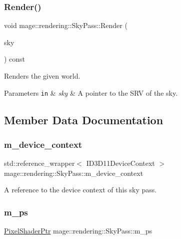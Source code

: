 \subsubsection{\texorpdfstring{Render()}{Render()}}
{\footnotesize\ttfamily void mage\+::rendering\+::\+Sky\+Pass\+::\+Render (\begin{DoxyParamCaption}\item[{I\+D3\+D11\+Shader\+Resource\+View $\ast$}]{sky }\end{DoxyParamCaption}) const\hspace{0.3cm}{\ttfamily [noexcept]}}

Renders the given world.


\begin{DoxyParams}[1]{Parameters}
\mbox{\tt in}  & {\em sky} & A pointer to the S\+RV of the sky. \\
\hline
\end{DoxyParams}


\subsection{Member Data Documentation}
\hypertarget{classmage_1_1rendering_1_1_sky_pass_a5639f9eb6bf863074c5e5afba2f0e2f5}{}\label{classmage_1_1rendering_1_1_sky_pass_a5639f9eb6bf863074c5e5afba2f0e2f5} 
\subsubsection{\texorpdfstring{m\+\_\+device\+\_\+context}{m\_device\_context}}
{\footnotesize\ttfamily std\+::reference\+\_\+wrapper$<$ I\+D3\+D11\+Device\+Context $>$ mage\+::rendering\+::\+Sky\+Pass\+::m\+\_\+device\+\_\+context\hspace{0.3cm}{\ttfamily [private]}}

A reference to the device context of this sky pass. \hypertarget{classmage_1_1rendering_1_1_sky_pass_a945613544f942b4278454a89bb5e1513}{}\label{classmage_1_1rendering_1_1_sky_pass_a945613544f942b4278454a89bb5e1513} 
\subsubsection{\texorpdfstring{m\+\_\+ps}{m\_ps}}
{\footnotesize\ttfamily \hyperlink{namespacemage_1_1rendering_af03d922b228ee9c8542baaa2ecc9f259}{Pixel\+Shader\+Ptr} mage\+::rendering\+::\+Sky\+Pass\+::m\+\_\+ps\hspace{0.3cm}{\ttfamily [private]}}

